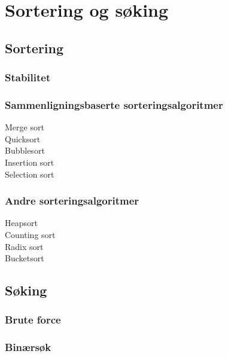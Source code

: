 \section{Sortering og søking}
\subsection{Sortering}
\subsubsection{Stabilitet}
\subsubsection{Sammenligningsbaserte sorteringsalgoritmer}
\large{Merge sort}\\
\large{Quicksort}\\
\large{Bubblesort}\\
\large{Insertion sort}\\
\large{Selection sort}\\
\subsubsection{Andre sorteringsalgoritmer}
\large{Heapsort}\\
\large{Counting sort}\\
\large{Radix sort}\\
\large{Bucketsort}\\
\subsection{Søking}
\subsubsection{Brute force}
\subsubsection{Binærsøk}